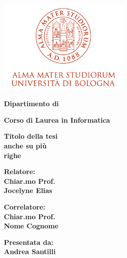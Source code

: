 \documentclass[12pt,a4paper,twoside]{book}
\begin{document}
\pagestyle{empty}

\begin{titlepage}

\begin{center}

\includegraphics[width=6.5cm,height=4.7cm]{img/marchio-di-ateneo.png}

\vspace{10mm}

{\large{\bf{Dipartimento di }}} 

\vspace{5mm}

{\Large{\bf{Corso di Laurea in Informatica}}}

\vspace{15mm}

{\Huge{\bf Titolo della tesi }}\\
\vspace{3mm}
{\Huge{\bf anche su più}}\\
\vspace{3mm}
{\Huge{\bf righe }}\\
\vspace{3mm}

\end{center}

\vspace{10mm}

\begin{minipage}[t]{0.40\textwidth}
{\Large{\bf Relatore: \\ Chiar.mo Prof.\\ Jocelyne Elias}}

\vspace{3mm}

{\Large{\bf Correlatore: \\ Chiar.mo Prof.\\ Nome Cognome}}
\end{minipage}
\hfill
\begin{minipage}[t]{0.40\textwidth}\raggedleft
{\Large{\bf Presentata da: \\ Andrea Santilli}}
\end{minipage}


\end{titlepage}
\end{document}
